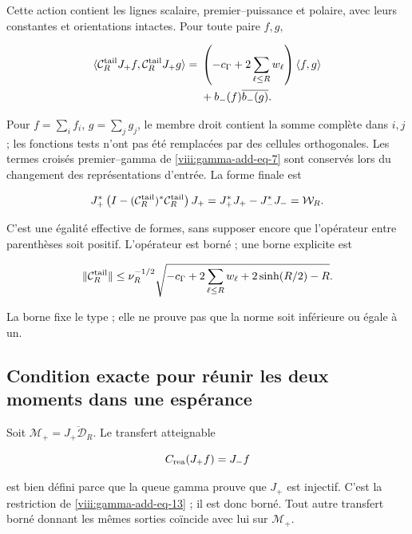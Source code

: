 Cette action contient les lignes scalaire, premier--puissance et polaire, avec leurs constantes et orientations intactes. Pour toute paire \(f,g\),

\begin{equation}
\begin{aligned}
\langle\mathcal C_R^{\rm tail}J_+f,\mathcal C_R^{\rm tail}J_+g\rangle
={}&\left(-c_\Gamma+2\sum_{\ell\le R}w_\ell\right)\langle f,g\rangle\\
&+b_-(f)\overline{b_-(g)}.
\end{aligned}
\label{viii:gamma-add-eq-15}
\end{equation}

Pour \(f=\sum_i f_i\), \(g=\sum_j g_j\), le membre droit contient la somme complète dans \(i,j\) ; les fonctions tests n'ont pas été remplacées par des cellules orthogonales. Les termes croisés premier--gamma de \eqref{viii:gamma-add-eq-7} sont conservés lors du changement des représentations d'entrée. La forme finale est

\begin{equation}
J_+^*\left(I-(\mathcal C_R^{\rm tail})^*\mathcal C_R^{\rm tail}\right)J_+
=J_+^*J_+-J_-^*J_-=\mathcal W_R.
\label{viii:gamma-add-eq-16}
\end{equation}

C'est une égalité effective de formes, sans supposer encore que l'opérateur entre parenthèses soit positif. L'opérateur est borné ; une borne explicite est

\begin{equation}
\|\mathcal C_R^{\rm tail}\|
\le\nu_R^{-1/2}
\sqrt{-c_\Gamma+2\sum_{\ell\le R}w_\ell+2\sinh(R/2)-R}.
\label{viii:gamma-add-display-33}
\end{equation}

La borne fixe le type ; elle ne prouve pas que la norme soit inférieure ou égale à un.

\subsection{Condition exacte pour réunir les deux moments dans une espérance}
\label{viii:gamma-add-sub-375}

Soit \(\mathcal M_+=\overline{J_+\mathcal D_R}\). Le transfert atteignable

\begin{equation}
C_{\rm rea}(J_+f)=J_-f
\label{viii:gamma-add-display-34}
\end{equation}

est bien défini parce que la queue gamma prouve que \(J_+\) est injectif. C'est la restriction de \eqref{viii:gamma-add-eq-13} ; il est donc borné. Tout autre transfert borné donnant les mêmes sorties coïncide avec lui sur \(\mathcal M_+\).

